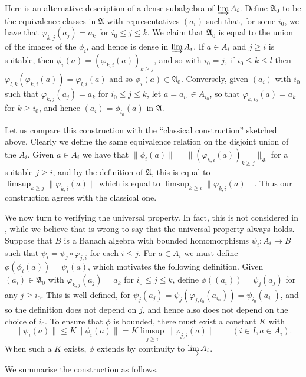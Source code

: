 \documentclass[a4paper,11pt]{article}
\newcommand{\mf}{\mathfrak}
\newcommand{\indlim}{\varinjlim}
\theoremstyle{definition}
\begin{document}
Here is an alternative description of a dense subalgebra of $\indlim A_i$.
Define $\mf A_0$ to be the equivalence classes in $\mf A$ with representatives $(a_i)$ such that,
for some $i_0$, we have that $\varphi_{k,j}(a_j) = a_k$ for $i_0 \leq j \leq k$.  We claim that
$\mf A_0$ is equal to the union of the images of the $\phi_i$, and hence is dense in
$\indlim A_i$.  If $a\in A_i$ and $j\geq i$ is suitable, then $\phi_i(a) = ( \varphi_{k,i}(a)
)_{k\geq j}$, and so with $i_0=j$, if $i_0 \leq k \leq l$ then $\varphi_{l,k}( \varphi_{k,i}(a) )
= \varphi_{l,i}(a)$ and so $\phi_i(a)\in \mf A_0$.  Conversely, given $(a_i)$ with $i_0$ such that
$\varphi_{k,j}(a_j) = a_k$ for $i_0 \leq j \leq k$, let $a = a_{i_0} \in A_{i_0}$, so that
$\varphi_{k,i_0}(a) = a_k$ for $k\geq i_0$, and hence $(a_i) = \phi_{i_0}(a)$ in $\mf A$.

Let us compare this construction with the ``classical construction'' sketched above.  Clearly we
define the same equivalence relation on the disjoint union of the $A_i$.  Given $a\in A_i$ we have
that $\|\phi_i(a)\| = \|(\varphi_{k,i}(a))_{k\geq j}\|_{\mf A}$ for a suitable $j\geq i$, and by
the definition of $\mf A$, this is equal to $\limsup_{k\geq j} \|\varphi_{k,i}(a)\|$ which is
equal to $\limsup_{k\geq i} \|\varphi_{k,i}(a)\|$.  Thus our construction agrees with the
classical one.

We now turn to verifying the universal property.  In fact, this is not considered in
\cite{blackadar}, while we believe that \cite{palmer} is wrong to say that the universal property
always holds.    Suppose that $B$ is a Banach algebra with bounded homomorphisms $\psi_i:A_i
\rightarrow B$ such that $\psi_i = \psi_j \circ \varphi_{j,i}$ for each $i\leq j$.  For $a\in A_i$
we must define $\phi(\phi_i(a)) = \psi_i(a)$, which motivates the following definition.  Given
$(a_i) \in \mf A_0$ with $\varphi_{k,j}(a_j) = a_k$ for $i_0 \leq j\leq k$, define
$\phi((a_i)) = \psi_j(a_j)$ for any $j\geq i_0$.  This is well-defined, for $\psi_j(a_j) =
\psi_j(\varphi_{j,i_0}(a_{i_0})) = \psi_{i_0}(a_{i_0})$, and so the definition does not depend on
$j$, and hence also does not depend on the choice of $i_0$.  To ensure that $\phi$ is bounded,
there must exist a constant $K$ with
\[ \|\psi_i(a)\| \leq K \|\phi_i(a)\| = K \limsup_{j\geq i} \|\varphi_{j,i}(a)\|
\qquad (i\in I, a\in A_i). \]
When such a $K$ exists, $\phi$ extends by continuity to $\indlim A_i$.

We summarise the construction as follows.
\end{document}
